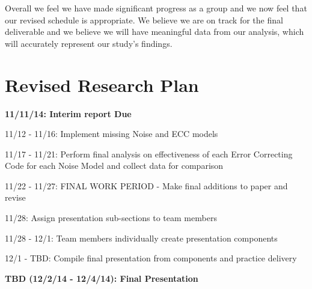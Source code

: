 \documentclass{sigcomm-alternate}
\begin{document}
Overall we feel we have made significant progress as a group and we now feel that our revised schedule is appropriate. We believe we are on track for the final deliverable and we believe we will have meaningful data from our analysis, which will accurately represent our study's findings.

\section{Revised Research Plan}

\textbf{11/11/14: Interim report Due}

11/12 - 11/16: Implement missing Noise and ECC models

11/17 - 11/21: Perform final analysis on effectiveness of each Error Correcting Code for each Noise Model and collect data for comparison

11/22 - 11/27: FINAL WORK PERIOD - Make final additions to paper and revise

11/28: Assign presentation sub-sections to team members

11/28 - 12/1: Team members individually create presentation components

12/1 - TBD: Compile final presentation from components and practice delivery

\textbf{TBD (12/2/14 - 12/4/14): Final Presentation}

\nocite{*}

 

\balancecolumns
\end{document}
